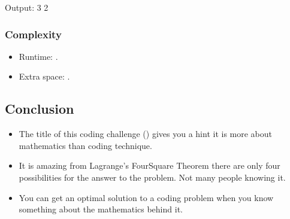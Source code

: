 \documentclass[letterpaper,12pt,english]{book}
\begin{document}
\begin{sphinxVerbatim}[commandchars=\\\{\}]
\end{sphinxVerbatim}

\begin{sphinxVerbatim}[commandchars=\\\{\}]
Output:
3
2
\end{sphinxVerbatim}


\subsubsection{Complexity}
\label{\detokenize{Mathematics/09_MTH_279_Perfect_Squares:id7}}\begin{itemize}
\item {} 
\sphinxAtStartPar
Runtime: .

\item {} 
\sphinxAtStartPar
Extra space: .

\end{itemize}


\subsection{Conclusion}
\label{\detokenize{Mathematics/09_MTH_279_Perfect_Squares:conclusion}}\begin{itemize}
\item {} 
\sphinxAtStartPar
The title of this coding challenge () gives you a hint it is more about mathematics than coding technique.

\item {} 
\sphinxAtStartPar
It is amazing from Lagrange’s Four\sphinxhyphen{}Square Theorem there are only four possibilities for the answer to the problem. Not many people knowing it.

\item {} 
\sphinxAtStartPar
You can get an optimal solution to a coding problem when you know something about the mathematics behind it.

\end{itemize}
\end{document}
